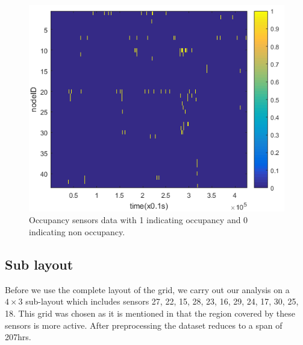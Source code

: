 \begin{figure}[!ht]
\includegraphics{./pics/heatMap.png}
\caption{Occupancy sensors data with 1 indicating occupancy and 0 indicating non occupancy.}
\label{fig:heatMap}
\end{figure}






\subsection{Sub layout}
Before we use the complete layout of the grid, we carry out our analysis on a $4 \times 3$ sub-layout which includes sensors 27, 22, 15, 28, 23, 16, 29, 24, 17, 30, 25, 18. This grid was chosen as it is mentioned in \cite{cook2010detection} that the region covered by these sensors is more active. After preprocessing the dataset reduces to a span of 207hrs. 


